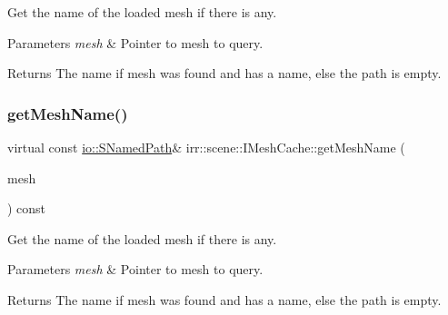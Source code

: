 Get the name of the loaded mesh if there is any. 


\begin{DoxyParams}{Parameters}
{\em mesh} & Pointer to mesh to query. \\
\hline
\end{DoxyParams}
\begin{DoxyReturn}{Returns}
The name if mesh was found and has a name, else the path is empty. 
\end{DoxyReturn}
\mbox{\label{classirr_1_1scene_1_1IMeshCache_a7271fa1247b8c1198c196dc947b5ede0}} 
\subsubsection{\texorpdfstring{get\+Mesh\+Name()}{getMeshName()}\hspace{0.1cm}{\footnotesize\ttfamily [4/4]}}
{\footnotesize\ttfamily virtual const \hyperlink{structirr_1_1io_1_1SNamedPath}{io\+::\+S\+Named\+Path}\& irr\+::scene\+::\+I\+Mesh\+Cache\+::get\+Mesh\+Name (\begin{DoxyParamCaption}\item[{const \hyperlink{classirr_1_1scene_1_1IMesh}{I\+Mesh} $\ast$const}]{mesh }\end{DoxyParamCaption}) const\hspace{0.3cm}{\ttfamily [pure virtual]}}



Get the name of the loaded mesh if there is any. 


\begin{DoxyParams}{Parameters}
{\em mesh} & Pointer to mesh to query. \\
\hline
\end{DoxyParams}
\begin{DoxyReturn}{Returns}
The name if mesh was found and has a name, else the path is empty. 
\end{DoxyReturn}
\mbox{\label{classirr_1_1scene_1_1IMeshCache_a42a13fab5b76ab7142a1d47dac80548b}} 
